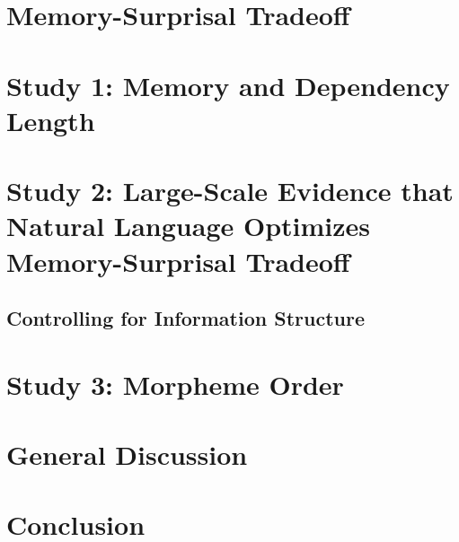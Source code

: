 \documentclass[11pt,letterpaper]{article}
\begin{document}



\section{Memory-Surprisal Tradeoff}\label{sec:ms-tradeoff}



\section{Study 1: Memory and Dependency Length}



%


\section{Study 2: Large-Scale Evidence that Natural Language Optimizes Memory-Surprisal Tradeoff}
\label{sec:main-experiment}



\subsection{Controlling for Information Structure}\label{subsec:freedom}



\section{Study 3: Morpheme Order}




\section{General Discussion}




\section{Conclusion}
\end{document}
